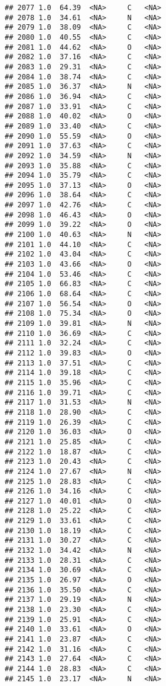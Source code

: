 \documentclass[
]{article}
\begin{document}
\begin{verbatim}
## 2077 1.0  64.39  <NA>     C   <NA>
## 2078 1.0  34.61  <NA>     N   <NA>
## 2079 1.0  38.09  <NA>     C   <NA>
## 2080 1.0  40.55  <NA>     C   <NA>
## 2081 1.0  44.62  <NA>     O   <NA>
## 2082 1.0  37.16  <NA>     C   <NA>
## 2083 1.0  29.31  <NA>     C   <NA>
## 2084 1.0  38.74  <NA>     C   <NA>
## 2085 1.0  36.37  <NA>     N   <NA>
## 2086 1.0  36.94  <NA>     C   <NA>
## 2087 1.0  33.91  <NA>     C   <NA>
## 2088 1.0  40.02  <NA>     O   <NA>
## 2089 1.0  33.40  <NA>     C   <NA>
## 2090 1.0  55.59  <NA>     O   <NA>
## 2091 1.0  37.63  <NA>     C   <NA>
## 2092 1.0  34.59  <NA>     N   <NA>
## 2093 1.0  35.88  <NA>     C   <NA>
## 2094 1.0  35.79  <NA>     C   <NA>
## 2095 1.0  37.13  <NA>     O   <NA>
## 2096 1.0  38.64  <NA>     C   <NA>
## 2097 1.0  42.76  <NA>     C   <NA>
## 2098 1.0  46.43  <NA>     O   <NA>
## 2099 1.0  39.22  <NA>     O   <NA>
## 2100 1.0  40.63  <NA>     N   <NA>
## 2101 1.0  44.10  <NA>     C   <NA>
## 2102 1.0  43.04  <NA>     C   <NA>
## 2103 1.0  43.66  <NA>     O   <NA>
## 2104 1.0  53.46  <NA>     C   <NA>
## 2105 1.0  66.83  <NA>     C   <NA>
## 2106 1.0  68.64  <NA>     C   <NA>
## 2107 1.0  56.54  <NA>     O   <NA>
## 2108 1.0  75.34  <NA>     O   <NA>
## 2109 1.0  39.81  <NA>     N   <NA>
## 2110 1.0  36.69  <NA>     C   <NA>
## 2111 1.0  32.24  <NA>     C   <NA>
## 2112 1.0  39.83  <NA>     O   <NA>
## 2113 1.0  37.51  <NA>     C   <NA>
## 2114 1.0  39.18  <NA>     C   <NA>
## 2115 1.0  35.96  <NA>     C   <NA>
## 2116 1.0  39.71  <NA>     C   <NA>
## 2117 1.0  31.53  <NA>     N   <NA>
## 2118 1.0  28.90  <NA>     C   <NA>
## 2119 1.0  26.39  <NA>     C   <NA>
## 2120 1.0  36.03  <NA>     O   <NA>
## 2121 1.0  25.85  <NA>     C   <NA>
## 2122 1.0  18.87  <NA>     C   <NA>
## 2123 1.0  20.43  <NA>     C   <NA>
## 2124 1.0  27.67  <NA>     N   <NA>
## 2125 1.0  28.83  <NA>     C   <NA>
## 2126 1.0  34.16  <NA>     C   <NA>
## 2127 1.0  40.01  <NA>     O   <NA>
## 2128 1.0  25.22  <NA>     C   <NA>
## 2129 1.0  33.61  <NA>     C   <NA>
## 2130 1.0  18.19  <NA>     C   <NA>
## 2131 1.0  30.27  <NA>     C   <NA>
## 2132 1.0  34.42  <NA>     N   <NA>
## 2133 1.0  28.31  <NA>     C   <NA>
## 2134 1.0  30.69  <NA>     C   <NA>
## 2135 1.0  26.97  <NA>     O   <NA>
## 2136 1.0  35.50  <NA>     C   <NA>
## 2137 1.0  29.19  <NA>     N   <NA>
## 2138 1.0  23.30  <NA>     C   <NA>
## 2139 1.0  25.91  <NA>     C   <NA>
## 2140 1.0  33.61  <NA>     O   <NA>
## 2141 1.0  23.87  <NA>     C   <NA>
## 2142 1.0  31.16  <NA>     C   <NA>
## 2143 1.0  27.64  <NA>     C   <NA>
## 2144 1.0  28.83  <NA>     C   <NA>
## 2145 1.0  23.17  <NA>     N   <NA>

\end{verbatim}
\end{document}
